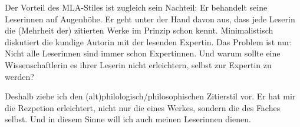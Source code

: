 Der Vorteil des MLA-Stiles ist zugleich sein Nachteil: Er behandelt seine Lese\-rin\-nen auf Augenhöhe. Er geht unter der Hand davon aus, dass jede Leserin die (Mehrheit der) zitierten Werke im Prinzip schon kennt. Minimalistisch diskutiert die kundige Autorin mit der lesenden Expertin. Das Problem ist nur: Nicht alle Leserinnen sind immer schon Expertinnen. Und warum sollte eine Wissenschaftlerin es ihrer Leserin nicht erleichtern, selbst zur Expertin zu werden?

Deshalb ziehe ich den (alt)philologisch/philosophischen Zitierstil vor. Er hat mir die Rezpetion erleichtert, nicht nur die eines Werkes, sondern die des Faches selbst. Und in diesem Sinne will ich auch meinen Leserinnen dienen.


%
